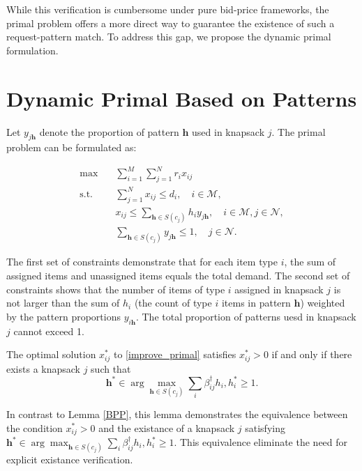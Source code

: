 While this verification is cumbersome under pure bid-price frameworks, the primal problem offers a more direct way to guarantee the existence of such a request-pattern match. To address this gap, we propose the dynamic primal formulation.

\section{Dynamic Primal Based on Patterns}

Let $y_{j \bm{h}}$ denote the proportion of pattern $\bm{h}$ used in knapsack $j$. The primal problem can be formulated as:

\begin{equation}\label{improve_primal}
    \begin{aligned}
    \max \quad & \sum_{i=1}^M \sum_{j=1}^N r_i x_{i j} \\
    \text {s.t.} \quad & \sum_{j=1}^N x_{i j} \leq d_i, \quad i \in \mathcal{M}, \\
    & x_{i j} \leq \sum_{\bm{h} \in S(c_{j})} h_i y_{j \bm{h}}, \quad i \in \mathcal{M}, j \in \mathcal{N}, \\
    & \sum_{\bm{h} \in S(c_{j})} y_{j \bm{h}} \leq 1, \quad j \in \mathcal{N}.
    \end{aligned}
\end{equation}

The first set of constraints demonstrate that for each item type $i$, the sum of assigned items and unassigned items equals the total demand. The second set of constraints shows that the number of items of type $i$ assigned in knapsack $j$ is not larger than the sum of $h_{i}$ (the count of type $i$ items in pattern $\bm{h}$) weighted by the pattern proportions $y_{i \bm{h}}$. The total proportion of patterns uesd in knapsack $j$ cannot exceed 1.

\begin{lem}\label{primal}
The optimal solution $x_{ij}^{*}$ to \eqref{improve_primal} satisfies $x_{ij}^{*} > 0$ if and only if there exists a knapsack $j$ such that $$\bm{h}^{*} \in \arg\max_{\bm{h} \in S(c_j)} \sum_{i} \beta_{ij}^{\dag} h_{i}, h_{i}^{*} \geq 1.$$
\end{lem}

In contrast to Lemma \ref{BPP}, this lemma demonstrates the equivalence between the condition $x_{ij}^{*} > 0$ and the existance of a knapsack $j$ satisfying $\bm{h}^{*} \in \arg\max_{\bm{h} \in S(c_j)} \sum_{i} \beta_{ij}^{\dag} h_{i}, h_{i}^{*} \geq 1$. This equivalence eliminate the need for explicit existance verification.

